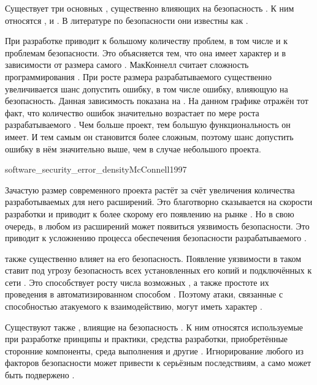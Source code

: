 %
Существует три основных , существенно влияющих на безопасность . 
%
К ним относятся ,  и  .
%
В литературе по безопасности они известны как  .

%
При разработке   приводит к большому количеству проблем, в том числе и к проблемам безопасности.
%
Это объясняется тем, что она имеет характер  и  в зависимости от размера самого  .
%
МакКоннелл считает сложность  программирования .
%
При росте размера разрабатываемого  существенно увеличивается шанс допустить ошибку, в том числе ошибку, влияющую на безопасность.
%
Данная зависимость показана на . 
%
На данном графике отражён тот факт, что количество ошибок значительно возрастает по мере роста разрабатываемого . 
%
Чем больше проект, тем большую функциональность он имеет. 
%
И тем самым он становится более сложным, поэтому шанс допустить ошибку в нём значительно выше, чем в случае небольшого проекта. 

	{software_security_error_density}{McConnell1997}

%
Зачастую размер современного проекта растёт за счёт увеличения количества разработываемых для него расширений. 
%
Это благотворно сказывается на скорости разработки и приводит к более скорому его появлению на рынке .
%
Но в свою очередь, в любом из расширений может появиться уязвимость безопасности. 
%
Это приводит к усложнению процесса обеспечения безопасности разрабатываемого .

%
 также существенно влияет на его безопасность.
%
Появление уязвимости в таком  ставит под угрозу безопасность всех установленных его копий и подключённых к сети  . 
%
Это способствует росту числа возможных , а также простоте их проведения в автоматизированном способом .
%
Поэтому атаки, связанные с способностью атакуемого  к взаимодействию, могут иметь характер .

%
Существуют также , влиящие на безопасность .
%
К ним относятся используемые при разработке принципы и практики, средства разработки, приобретённые сторонние компоненты, среда выполнения и другие . 
%
Игнорирование любого из факторов безопасности может привести к серьёзным последствиям, а само  может быть подвержено . 